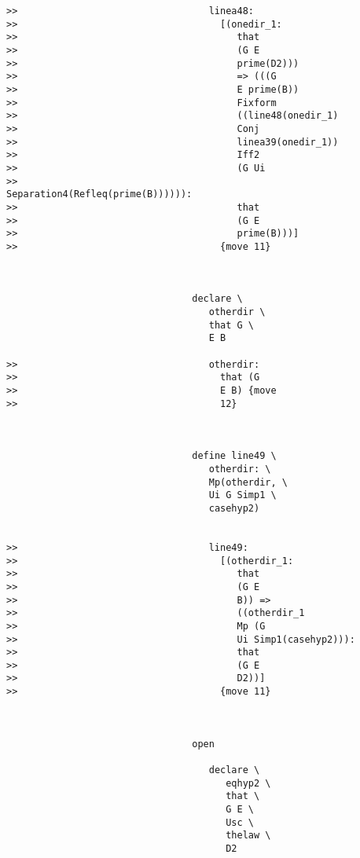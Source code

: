 \documentclass[12pt]{article}
\begin{document}
\begin{verbatim}
>>                                  linea48:
>>                                    [(onedir_1:
>>                                       that
>>                                       (G E
>>                                       prime(D2)))
>>                                       => (((G
>>                                       E prime(B))
>>                                       Fixform
>>                                       ((line48(onedir_1)
>>                                       Conj
>>                                       linea39(onedir_1))
>>                                       Iff2
>>                                       (G Ui
>>                                       Separation4(Refleq(prime(B)))))):
>>                                       that
>>                                       (G E
>>                                       prime(B)))]
>>                                    {move 11}



                                 declare \
                                    otherdir \
                                    that G \
                                    E B

>>                                  otherdir:
>>                                    that (G
>>                                    E B) {move
>>                                    12}



                                 define line49 \
                                    otherdir: \
                                    Mp(otherdir, \
                                    Ui G Simp1 \
                                    casehyp2)


>>                                  line49:
>>                                    [(otherdir_1:
>>                                       that
>>                                       (G E
>>                                       B)) =>
>>                                       ((otherdir_1
>>                                       Mp (G
>>                                       Ui Simp1(casehyp2))):
>>                                       that
>>                                       (G E
>>                                       D2))]
>>                                    {move 11}



                                 open

                                    declare \
                                       eqhyp2 \
                                       that \
                                       G E \
                                       Usc \
                                       thelaw \
                                       D2


\end{verbatim}
\end{document}
